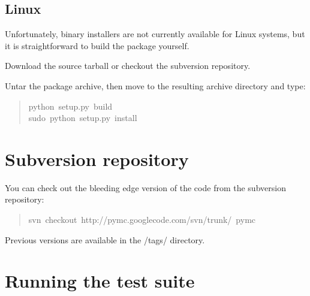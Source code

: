 \hypertarget{linux}{}
\subsection*{Linux}
\label{linux}

Unfortunately, binary installers are not currently available for Linux systems,
but it is straightforward to build the package yourself.
\setcounter{listcnt0}{0}
\begin{list}{.}
{
\setlength{\rightmargin}{\leftmargin}
}
\item {} 
Download the source tarball or checkout the subversion repository.

\item {} 
Untar the package archive, then move to the resulting archive directory and type:
\begin{quote}{\ttfamily \raggedright \noindent
python~setup.py~build~\\
sudo~python~setup.py~install
}\end{quote}

\end{list}



\hypertarget{subversion-repository}{}
\section*{Subversion repository}
\label{subversion-repository}

You can check out the bleeding edge version of the code from the subversion
repository:
\begin{quote}{\ttfamily \raggedright \noindent
svn~checkout~http://pymc.googlecode.com/svn/trunk/~pymc
}\end{quote}

Previous versions are available in the /tags/ directory.



\hypertarget{running-the-test-suite}{}
\section*{Running the test suite}
\label{running-the-test-suite}

